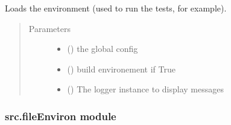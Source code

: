 \documentclass[a4paper,10pt,english]{sphinxmanual}
\begin{document}
\begin{fulllineitems}
\label{\detokenize{commands/apidoc/src:src.environment.load_environment}}
Loads the environment (used to run the tests, for example).
\begin{quote}\begin{description}
\item[{Parameters}] \leavevmode\begin{itemize}
\item {} 
 () \textendash{} the global config

\item {} 
 () \textendash{} build environement if True

\item {} 
 () \textendash{} The logger instance to display messages

\end{itemize}

\end{description}\end{quote}

\end{fulllineitems}



\subsubsection{src.fileEnviron module}
\label{\detokenize{commands/apidoc/src:src-fileenviron-module}}\label{\detokenize{commands/apidoc/src:module-src.fileEnviron}}
\end{document}
